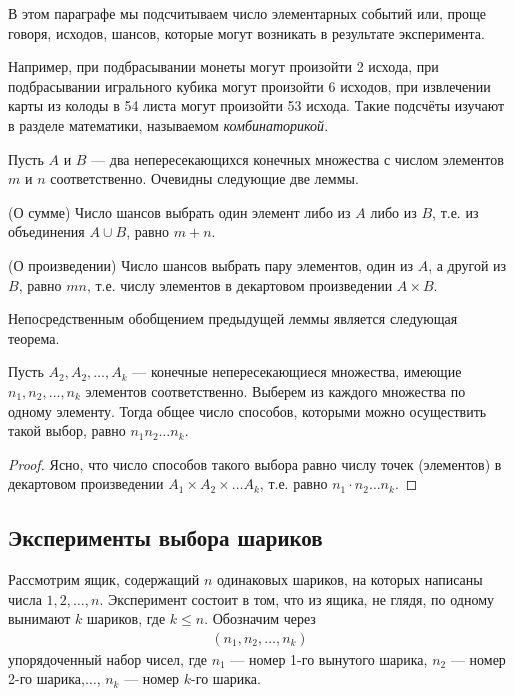 
В этом параграфе мы подсчитываем число элементарных событий или, проще говоря, исходов, шансов, которые могут возникать в результате эксперимента. 

Например, при подбрасывании монеты могут произойти 2 исхода,
при подбрасывании игрального кубика могут произойти 6 исходов, при извлечении карты из колоды в 54 листа могут произойти 53 исхода. Такие подсчёты изучают в разделе математики, называемом \textit{комбинаторикой}.

Пусть $A$ и $B$ — два непересекающихся конечных множества с числом
элементов $m$ и $n$ соответственно. Очевидны следующие две леммы.



\begin{lemma}(О сумме) 
\label{lemma:1.1}
Число шансов выбрать один элемент либо из $A$
либо из $B$, т.е. из объединения $A\cup B$, равно $m+n$.
\end{lemma}
\begin{lemma}(О произведении) 
\label{lemma:1.2}
Число шансов выбрать пару элементов,
один из $A$, а другой из $B$, равно $mn$, т.е. числу элементов в декартовом
произведении $A\times B$.
\end{lemma}
Непосредственным обобщением предыдущей леммы является следующая
теорема.
\begin{theorem}
\label{th:1.3}
Пусть $A_2,A_2,\dots,A_k$ — конечные непересекающиеся множества, имеющие $n_1
,n_2, \dots, n_k$ элементов соответственно. Выберем из
каждого множества по одному элементу. Тогда общее число способов, которыми можно осуществить такой выбор, равно $n_1n_2\dots n_k$.
\end{theorem}
\begin{proof}

Ясно, что число способов такого выбора равно числу точек (элементов) в декартовом произведении $A_1\times A_2\times\dots A_k$, т.е. равно $
n_1\cdot n_2\dots n_k$.
\end{proof}
\subsection{Эксперименты выбора шариков}

Рассмотрим ящик, содержащий $n$ одинаковых шариков, на которых написаны
числа $1, 2,\dots, n$. Эксперимент состоит в том, что из ящика, не глядя, по
одному вынимают $k$ шариков, где $k\leqslant n$. Обозначим через
\begin{gather*}
(n_1, n_2,\dots, n_k)
\end{gather*}
упорядоченный набор чисел, где $n_1$ — номер 1-го вынутого шарика, $n_2$ —
номер 2-го шарика,$\dots$, $n_k$ — номер $k$-го шарика.

